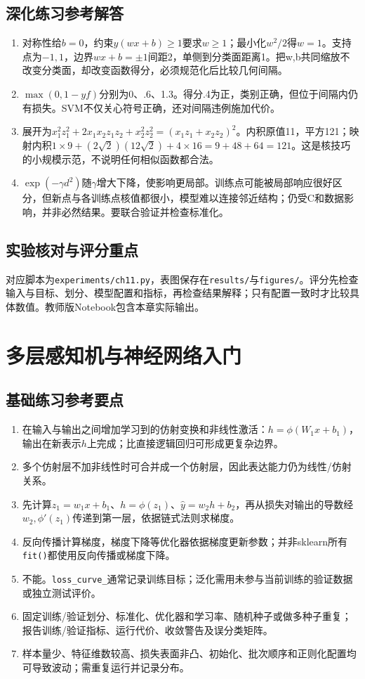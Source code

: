 \section*{深化练习参考解答}
\begin{enumerate}[label=D\arabic*.]
\item 对称性给$b=0$，约束$y(wx+b)\ge1$要求$w\ge1$；最小化$w^2/2$得$w=1$。支持点为$-1,1$，边界$wx+b=\pm1$间距2，单侧到分类面距离1。把w,b共同缩放不改变分类面，却改变函数得分，必须规范化后比较几何间隔。
\item $\max(0,1-yf)$分别为0、.6、1.3。得分.4为正，类别正确，但位于间隔内仍有损失。SVM不仅关心符号正确，还对间隔违例施加代价。
\item 展开为$x_1^2z_1^2+2x_1x_2z_1z_2+x_2^2z_2^2=(x_1z_1+x_2z_2)^2$。内积原值11，平方121；映射内积$1\times9+(2\sqrt2)(12\sqrt2)+4\times16=9+48+64=121$。这是核技巧的小规模示范，不说明任何相似函数都合法。
\item $\exp(-\gamma d^2)$随$\gamma$增大下降，使影响更局部。训练点可能被局部响应很好区分，但新点与各训练点核值都很小，模型难以连接邻近结构；仍受C和数据影响，并非必然结果。要联合验证并检查标准化。
\end{enumerate}

\section*{实验核对与评分重点}
对应脚本为\texttt{experiments/ch11.py}，表图保存在\texttt{results/}与\texttt{figures/}。评分先检查输入与目标、划分、模型配置和指标，再检查结果解释；只有配置一致时才比较具体数值。教师版Notebook包含本章实际输出。

\chapter{多层感知机与神经网络入门}
\section*{基础练习参考要点}
\begin{enumerate}[label=\arabic*.]
\item 在输入与输出之间增加学习到的仿射变换和非线性激活：$h=\phi(W_1x+b_1)$，输出在新表示$h$上完成；比直接逻辑回归可形成更复杂边界。
\item 多个仿射层不加非线性时可合并成一个仿射层，因此表达能力仍为线性/仿射关系。
\item 先计算$z_1=w_1x+b_1$、$h=\phi(z_1)$、$\hat y=w_2h+b_2$，再从损失对输出的导数经$w_2,\phi'(z_1)$传递到第一层，依据链式法则求梯度。
\item 反向传播计算梯度，梯度下降等优化器依据梯度更新参数；并非sklearn所有\texttt{fit()}都使用反向传播或梯度下降。
\item 不能。\texttt{loss\_curve\_}通常记录训练目标；泛化需用未参与当前训练的验证数据或独立测试评价。
\item 固定训练/验证划分、标准化、优化器和学习率、随机种子或做多种子重复；报告训练/验证指标、运行代价、收敛警告及误分类矩阵。
\item 样本量少、特征维数较高、损失表面非凸、初始化、批次顺序和正则化配置均可导致波动；需重复运行并记录分布。
\end{enumerate}
